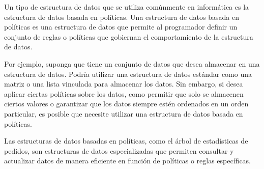 Un tipo de estructura de datos que se utiliza comúnmente en informática es la estructura de datos basada en políticas. Una estructura de datos basada en políticas es una estructura de datos que permite al programador definir un conjunto de reglas o políticas que gobiernan el comportamiento de la estructura de datos.

Por ejemplo, suponga que tiene un conjunto de datos que desea almacenar en una estructura de datos. Podría utilizar una estructura de datos estándar como una matriz o una lista vinculada para almacenar los datos. Sin embargo, si desea aplicar ciertas políticas sobre los datos, como permitir que solo se almacenen ciertos valores o garantizar que los datos siempre estén ordenados en un orden particular, es posible que necesite utilizar una estructura de datos basada en políticas.

Las estructuras de datos basadas en políticas, como el árbol de estadísticas de pedidos, son estructuras de datos especializadas que permiten consultar y actualizar datos de manera eficiente en función de políticas o reglas específicas. 